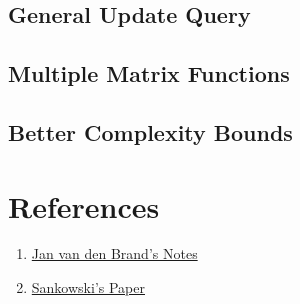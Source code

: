 \documentclass[12pt]{article}
\begin{document}
\subsection{General Update Query}
\subsection{Multiple Matrix Functions}
\subsection{Better Complexity Bounds}

\section*{References}

\begin{enumerate}
    \item \href{https://www.dropbox.com/scl/fi/zjfbk8dbxbzcn05dr8l11/fall22_daa_lecturenotes.pdf?rlkey=g6z7z1hvj7jknvlpy1s3dqcjw&e=1&st=13r18doq&dl=0}{Jan van den Brand's Notes}
    \item \href{https://www.dropbox.com/scl/fi/5w4k0lg0u8e36zugapp6c/Sankowski-COCOON-05-subquadratic-dynamic-distances.pdf?rlkey=5eahwsl7a49kwxyvlr7yqyoz3&e=2&st=d3zo7owc&dl=0}{Sankowski's Paper}
\end{enumerate}
\end{document}
